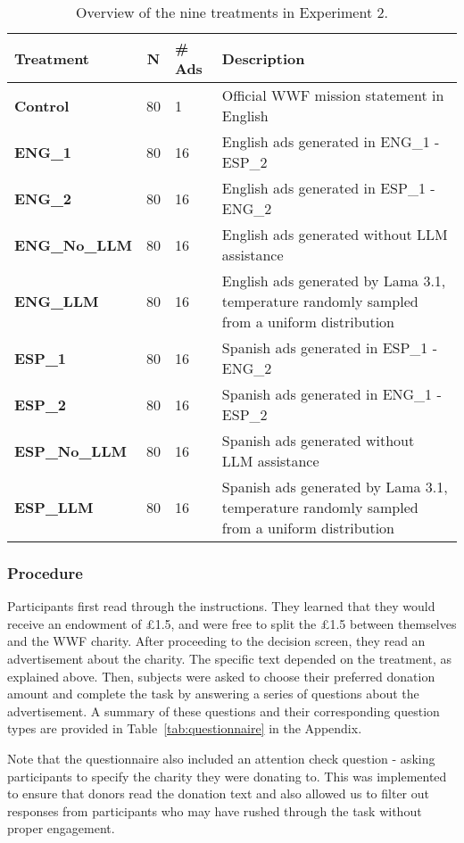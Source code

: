 \begin{table*}[htbp]
\centering
\caption{Overview of the nine treatments in Experiment 2.}
\label{tab:treatment-groups}
\footnotesize
\begin{tabular}{@{}p{1.8cm}cp{1cm}p{6.5cm}@{}}
\toprule
\textbf{Treatment} & \textbf{N} & \textbf{\# Ads} & \textbf{Description} \\
\midrule
\textbf{Control}   & 80 & 1  & Official WWF mission statement in English \\
\textbf{ENG\_1}    & 80 & 16 & English ads generated in ENG\_1 - ESP\_2 \\
\textbf{ENG\_2}    & 80 & 16 & English ads generated in ESP\_1 - ENG\_2 \\
\textbf{ENG\_No\_LLM}  & 80 & 16 & English ads generated without LLM assistance \\
\textbf{ENG\_LLM}  & 80 & 16 & English ads generated by Lama 3.1, temperature randomly sampled from a uniform distribution \\
\textbf{ESP\_1}    & 80 & 16 & Spanish ads generated in ESP\_1 - ENG\_2 \\
\textbf{ESP\_2}    & 80 & 16 & Spanish ads generated in ENG\_1 - ESP\_2 \\
\textbf{ESP\_No\_LLM}  & 80 & 16 & Spanish ads generated without LLM assistance \\
\textbf{ESP\_LLM}  & 80 & 16 & Spanish ads generated by Lama 3.1, temperature randomly sampled from a uniform distribution \\
\bottomrule
\end{tabular}
\end{table*}


\subsubsection{Procedure} Participants first read through the instructions. They learned that they would receive an endowment of \pounds1.5, and were free to split the \pounds1.5 between themselves and the WWF charity. After proceeding to the decision screen, they read an advertisement about the charity. The specific text depended on the treatment, as explained above. Then, subjects were asked to choose their preferred donation amount and complete the task by answering a series of questions about the advertisement. A summary of these questions and their corresponding question types are provided in Table~\ref{tab:questionnaire} in the Appendix.

Note that the questionnaire also included an attention check question - asking participants to specify the charity they were donating to. This was implemented to ensure that donors read the donation text and also allowed us to filter out responses from participants who may have rushed through the task without proper engagement.



